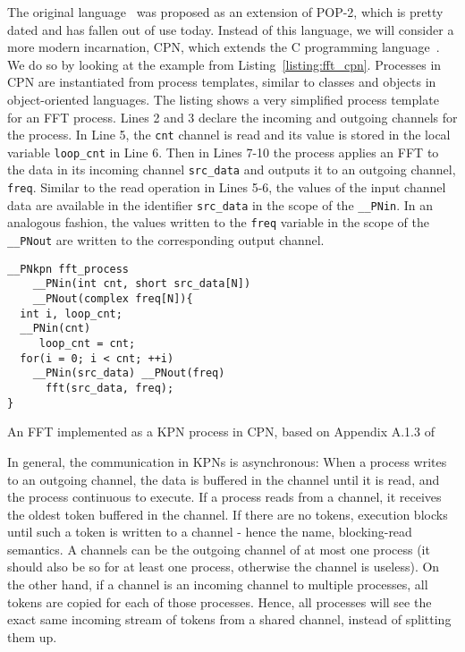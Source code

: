 The original language~\cite{kahn_macqueen} was proposed as an extension of POP-2, which is pretty dated and has fallen out of use today.
Instead of this language, we will consider a more modern incarnation, \ac{CPN}, which extends the C programming language~\cite{cpn}.
We do so by looking at the example from Listing~\ref{listing:fft_cpn}. 
Processes in \ac{CPN} are instantiated from process templates, similar to classes and objects in object-oriented languages.
The listing shows a very simplified process template for an \acs{FFT} process. 
Lines 2 and 3 declare the incoming and outgoing channels for the process.
In Line 5, the \texttt{cnt} channel is read and its value is stored in the local variable \texttt{loop\_cnt} in Line 6.
Then in Lines 7-10 the process applies an \acs{FFT} to the data in its incoming channel \texttt{src\_data} and outputs it to an outgoing channel, \texttt{freq}. 
Similar to the read operation in Lines 5-6, the values of the input channel data are available in the identifier \texttt{src\_data} in the scope of the \texttt{\_\_PNin}.
In an analogous fashion, the values written to the \texttt{freq} variable in the scope of the \texttt{\_\_PNout} are written to the corresponding output channel.

\begin{listing}
\begin{verbatim}
__PNkpn fft_process
    __PNin(int cnt, short src_data[N])
    __PNout(complex freq[N]){
  int i, loop_cnt;
  __PNin(cnt)
     loop_cnt = cnt;
  for(i = 0; i < cnt; ++i)
    __PNin(src_data) __PNout(freq)
      fft(src_data, freq);
}
\end{verbatim}
\caption{An \ac{FFT} implemented as a \ac{KPN} process in \ac{CPN}, based on Appendix A.1.3 of \cite{castrillon2014thesis}}
\label{listing:fft_cpn}
\end{listing}


In general, the communication in \acp{KPN} is asynchronous: 
When a process writes to an outgoing channel, the data is buffered in the channel until it is read, and the process continuous to execute.
If a process reads from a channel, it receives the oldest token buffered in the channel.
If there are no tokens, execution blocks until such a token is written to a channel - hence the name, blocking-read semantics.
A channels can be the outgoing channel of at most one process (it should also be so for at least one process, otherwise the channel is useless).
On the other hand, if a channel is an incoming channel to multiple processes, all tokens are copied for each of those processes.
Hence, all processes will see the exact same incoming stream of tokens from a shared channel, instead of splitting them up.

